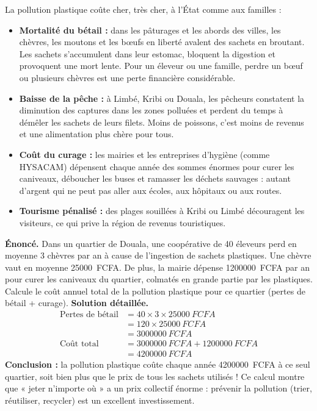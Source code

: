 \documentclass[11pt]{article}
\begin{document}
La pollution plastique coûte cher, très cher, à l'État comme aux familles :

\begin{itemize}
\item \textbf{Mortalité du bétail :} dans les pâturages et les abords des villes, les chèvres, les moutons et les bœufs en liberté avalent des sachets en broutant. Les sachets s'accumulent dans leur estomac, bloquent la digestion et provoquent une mort lente. Pour un éleveur ou une famille, perdre un bœuf ou plusieurs chèvres est une perte financière considérable.
\item \textbf{Baisse de la pêche :} à Limbé, Kribi ou Douala, les pêcheurs constatent la diminution des captures dans les zones polluées et perdent du temps à démêler les sachets de leurs filets. Moins de poissons, c'est moins de revenus et une alimentation plus chère pour tous.
\item \textbf{Coût du curage :} les mairies et les entreprises d'hygiène (comme HYSACAM) dépensent chaque année des sommes énormes pour curer les caniveaux, déboucher les buses et ramasser les déchets sauvages : autant d'argent qui ne peut pas aller aux écoles, aux hôpitaux ou aux routes.
\item \textbf{Tourisme pénalisé :} des plages souillées à Kribi ou Limbé découragent les visiteurs, ce qui prive la région de revenus touristiques.
\end{itemize}

\begin{exoresolu}
\textbf{Énoncé.} Dans un quartier de Douala, une coopérative de 40 éleveurs perd en moyenne 3 chèvres par an à cause de l'ingestion de sachets plastiques. Une chèvre vaut en moyenne \SI{25000}{FCFA}. De plus, la mairie dépense \SI{1200000}{FCFA} par an pour curer les caniveaux du quartier, colmatés en grande partie par les plastiques. Calcule le coût annuel total de la pollution plastique pour ce quartier (pertes de bétail + curage).
\tcblower
\textbf{Solution détaillée.}
\begin{align*}
\text{Pertes de bétail} &= 40 \times 3 \times \SI{25000}{FCFA} \\
&= 120 \times \SI{25000}{FCFA} \\
&= \SI{3000000}{FCFA} \\
\text{Coût total} &= \SI{3000000}{FCFA} + \SI{1200000}{FCFA} \\
&= \SI{4200000}{FCFA}
\end{align*}
\textbf{Conclusion :} la pollution plastique coûte chaque année \SI{4200000}{FCFA} à ce seul quartier, soit bien plus que le prix de tous les sachets utilisés ! Ce calcul montre que « jeter n'importe où » a un prix collectif énorme : prévenir la pollution (trier, réutiliser, recycler) est un excellent investissement.
\end{exoresolu}
\end{document}
